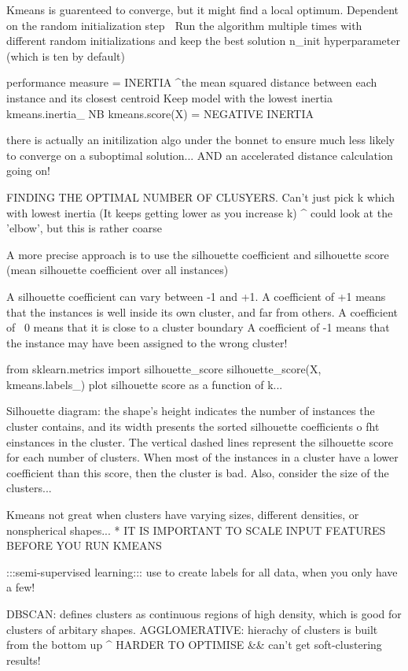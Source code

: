 Kmeans is guarenteed to converge, but it might find a local optimum.
Dependent on the random initialization step
^^^ Run the algorithm multiple times with different random initializations and keep the best solution
n_init hyperparameter (which is ten by default)

performance measure = INERTIA
^the mean squared distance between each instance and its closest centroid
Keep model with the lowest inertia
kmeans.inertia_
NB kmeans.score(X) = NEGATIVE INERTIA

there is actually an initilization algo under the bonnet
to ensure much less likely to converge on a suboptimal solution...
AND an accelerated distance calculation going on!

FINDING THE OPTIMAL NUMBER OF CLUSYERS.
Can't just pick k which with lowest inertia
(It keeps getting lower as you increase k)
^ could look at the 'elbow', but this is rather coarse

A more precise approach is to use the silhouette coefficient
and silhouette score (mean silhouette coefficient over all instances)

A silhouette coefficient can vary between -1 and +1.
A coefficient of +1 means that the instances is well inside its own cluster, and far from others.
A coefficient of ~0 means that it is close to a cluster boundary
A coefficient of -1 means that the instance may have been assigned to the wrong cluster!

from sklearn.metrics import silhouette_score
silhouette_score(X, kmeans.labels_)
plot silhouette score as a function of k...

Silhouette diagram:
the shape's height indicates the number of instances
the cluster contains, and its width presents the sorted silhouette coefficients o fht einstances in the cluster.
The vertical dashed lines represent the silhouette score for each number of clusters.
When most of the instances in a cluster have a lower coefficient than this score,
then the cluster is bad.
Also, consider the size of the clusters...

Kmeans not great when clusters have varying sizes,
different densities,
or nonspherical shapes...
* IT IS IMPORTANT TO SCALE INPUT FEATURES BEFORE YOU RUN KMEANS

:::semi-supervised learning:::
use to create labels for all data, when you only have a few!

DBSCAN: defines clusters as continuous regions of high density, which is good for clusters of arbitary shapes.
AGGLOMERATIVE: hierachy of clusters is built from the bottom up
^ HARDER TO OPTIMISE
&& can't get soft-clustering results!

